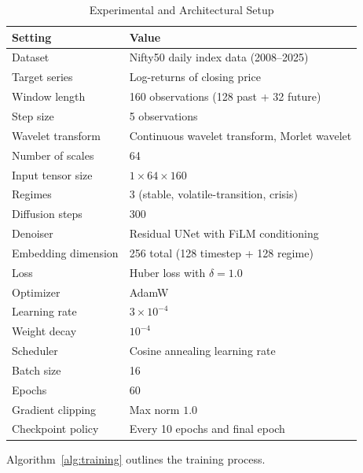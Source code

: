 \documentclass[conference]{IEEEtran}
\begin{document}
\begin{table}[!t]
\caption{Experimental and Architectural Setup}
\label{tab:setup}
\centering
\begin{tabular}{>{\raggedright\arraybackslash}p{2.35cm} p{5.1cm}}
\toprule
Setting & Value \\
\midrule
Dataset & Nifty50 daily index data (2008--2025) \\
Target series & Log-returns of closing price \\
Window length & 160 observations (128 past + 32 future) \\
Step size & 5 observations \\
Wavelet transform & Continuous wavelet transform, Morlet wavelet \\
Number of scales & 64 \\
Input tensor size & $1 \times 64 \times 160$ \\
Regimes & 3 (stable, volatile-transition, crisis) \\
Diffusion steps & 300 \\
Denoiser & Residual UNet with FiLM conditioning \\
Embedding dimension & 256 total (128 timestep + 128 regime) \\
Loss & Huber loss with $\delta=1.0$ \\
Optimizer & AdamW \\
Learning rate & $3\times 10^{-4}$ \\
Weight decay & $10^{-4}$ \\
Scheduler & Cosine annealing learning rate \\
Batch size & 16 \\
Epochs & 60 \\
Gradient clipping & Max norm $1.0$ \\
Checkpoint policy & Every 10 epochs and final epoch \\
\bottomrule
\end{tabular}
\end{table}

Algorithm~\ref{alg:training} outlines the training process.
\end{document}
